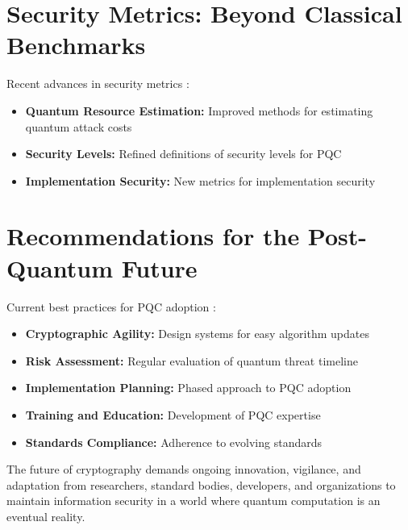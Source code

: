 \section{Security Metrics: Beyond Classical Benchmarks}\label{sec:metrics_ch8}

Recent advances in security metrics \parencite{security_metrics_2024}:

\begin{itemize}
    \item \textbf{Quantum Resource Estimation:} Improved methods for estimating quantum attack costs \parencite{quantum_resources_2024}
    \item \textbf{Security Levels:} Refined definitions of security levels for PQC \parencite{security_levels_2024}
    \item \textbf{Implementation Security:} New metrics for implementation security \parencite{implementation_security_2024}
\end{itemize}

\section{Recommendations for the Post-Quantum Future}\label{sec:future_recommendations_ch8}

Current best practices for PQC adoption \parencite{pqc_recommendations_2024}:

\begin{itemize}
    \item \textbf{Cryptographic Agility:} Design systems for easy algorithm updates
    \item \textbf{Risk Assessment:} Regular evaluation of quantum threat timeline
    \item \textbf{Implementation Planning:} Phased approach to PQC adoption
    \item \textbf{Training and Education:} Development of PQC expertise
    \item \textbf{Standards Compliance:} Adherence to evolving standards
\end{itemize}

The future of cryptography demands ongoing innovation, vigilance, and adaptation from researchers, standard bodies, developers, and organizations to maintain information security in a world where quantum computation is an eventual reality.